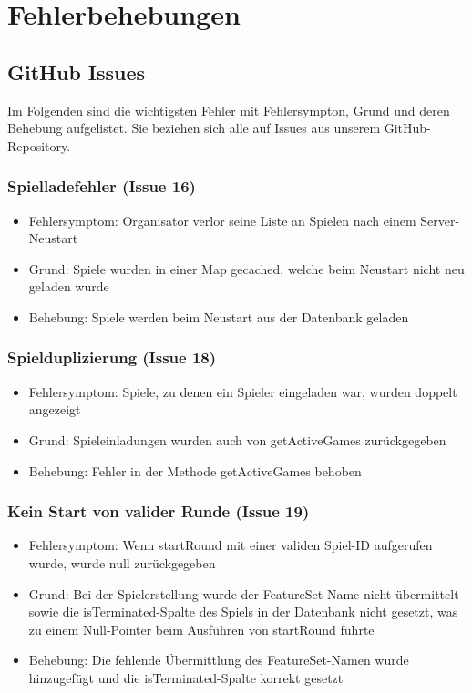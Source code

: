 \documentclass[a4paper]{scrreprt}
\begin{document}
    \chapter{Fehlerbehebungen}

    \section{GitHub Issues}
    Im Folgenden sind die wichtigsten Fehler mit Fehlersympton, Grund und deren Behebung aufgelistet. Sie beziehen sich alle auf Issues
    aus unserem GitHub-Repository.

    \subsection{Spielladefehler (Issue 16)}
    \begin{itemize}
        \item Fehlersymptom: Organisator verlor seine Liste an Spielen nach einem Server-Neustart
        \item Grund: Spiele wurden in einer Map gecached, welche beim Neustart nicht neu geladen wurde
        \item Behebung: Spiele werden beim Neustart aus der Datenbank geladen
    \end{itemize}

    \subsection{Spielduplizierung (Issue 18)}
    \begin{itemize}
        \item Fehlersymptom: Spiele, zu denen ein Spieler eingeladen war, wurden doppelt angezeigt
        \item Grund: Spieleinladungen wurden auch von getActiveGames zurückgegeben
        \item Behebung: Fehler in der Methode getActiveGames behoben
    \end{itemize}

    \subsection{Kein Start von valider Runde (Issue 19)}
    \begin{itemize}
        \item Fehlersymptom: Wenn startRound mit einer validen Spiel-ID aufgerufen wurde, wurde null zurückgegeben
        \item Grund: Bei der Spielerstellung wurde der FeatureSet-Name nicht übermittelt sowie die isTerminated-Spalte des Spiels
        in der Datenbank nicht gesetzt, was zu einem Null-Pointer beim Ausführen von startRound führte
        \item Behebung: Die fehlende Übermittlung des FeatureSet-Namen wurde hinzugefügt und die isTerminated-Spalte korrekt gesetzt
    \end{itemize}
\end{document}
